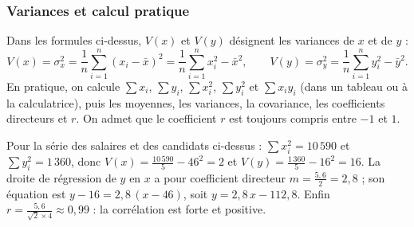                  \subsubsection{Variances et calcul pratique}
                        Dans les formules ci-dessus, $V(x)$ et $V(y)$ d\'esignent les variances de $x$ et de $y$ :
                        \[
                        V(x) = \sigma_x^2 = \frac{1}{n}\sum_{i=1}^{n}(x_i - \bar{x})^2 = \frac{1}{n}\sum_{i=1}^{n} x_i^2 - \bar{x}^2 ,
                        \qquad
                        V(y) = \sigma_y^2 = \frac{1}{n}\sum_{i=1}^{n} y_i^2 - \bar{y}^2 .
                        \]
                        En pratique, on calcule $\sum x_i$, $\sum y_i$, $\sum x_i^2$, $\sum y_i^2$ et $\sum x_i y_i$ 
                        (dans un tableau ou \`a la calculatrice), puis les moyennes, les variances, la covariance,
                        les coefficients directeurs et $r$. On admet que le coefficient $r$ est toujours compris entre $-1$ et $1$.
                        \begin{ex}
                              Pour la s\'erie des salaires et des candidats ci-dessus : $\sum x_i^2 = 10\,590$ et 
                              $\sum y_i^2 = 1\,360$, donc $V(x) = \frac{10\,590}{5} - 46^2 = 2$ et $V(y) = \frac{1\,360}{5} - 16^2 = 16$.
                              La droite de r\'egression de $y$ en $x$ a pour coefficient directeur $m = \frac{5,6}{2} = 2,8$ ; 
                              son \'equation est $y - 16 = 2,8\,(x - 46)$, soit $y = 2,8\,x - 112,8$.
                              Enfin $r = \frac{5,6}{\sqrt{2}\times 4} \approx 0,99$ : la corr\'elation est forte et positive.
                        \end{ex}
